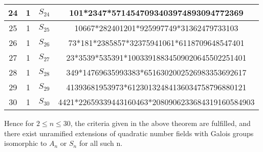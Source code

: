 \documentclass[12pt]{extarticle}
\newcommand{\<}{\langle}
\renewcommand{\>}{\rangle}
\theoremstyle{definition}
\begin{document}
\begin{center}
\begin{tabular}{||c | c | c | c||}
\hline
24 & 1 & $S_{24}$ & 101*2347*5714547093403974893094772369 \\
\hline
25 & 1 & $S_{25}$ & 10667*282401201*925997749*31362479733103 \\
\hline
26 & 1 & $S_{26}$ & 73*181*2385857*32375941061*6118709648547401 \\
\hline
27 & 1 & $S_{27}$ & 23*3539*535391*10033918834509020645502251401 \\
\hline
28 & 1 & $S_{28}$ & 349*14769635993383*6516302002526983353692617 \\
\hline
29 & 1 & $S_{29}$ & 41393681953973*61230132484136034758796880121 \\
\hline
30 & 1 & $S_{30}$ & 4421*22659339443160463*2080906233684319160584903 \\
\hline


\end{tabular}
\end{center}

Hence for $2 \leq n \leq 30$, the criteria given in the above theorem are fulfilled, and there exist unramified extensions of quadratic number fields with Galois groups isomorphic to $A_n$ or $S_n$ for all such n.  \par
\end{document}
